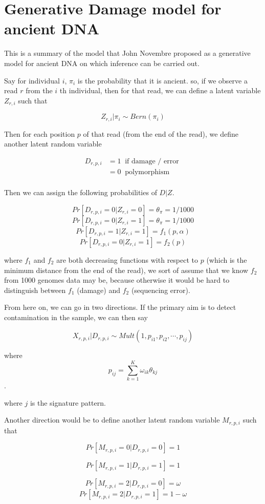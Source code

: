 \documentclass[12pt]{article}
\begin{document}
\section{Generative Damage model for ancient DNA}

This is a summary of the model that John Novembre proposed as a generative model for ancient DNA on which inference can be carried out. 

Say for individual $i$, $\pi_i$ is the probability that it is ancient. so, if we observe a read $r$ from the $i$ th individual, then for that read, we can define a latent variable $Z_{r,i}$ such that

$$  Z_{r,i} | \pi_{i} \sim Bern (\pi_{i}) $$

Then for each position $p$ of that read (from the end of the read), we define another latent random variable 

\begin{align}
D_{r,p,i}  & = 1  \;\; \text{if damage / error } \\
	      & = 0 \;\; \text{polymorphism} \\
\end{align}

Then we can assign the following probabilities of $D | Z$.

$$ Pr \left [ D_{r, p, i} = 0  |   Z_{r,i} = 0  \right ]  =  \theta_{\pi} = 1/1000 $$
$$ Pr \left [ D_{r, p, i} = 0  |   Z_{r,i} = 1  \right ]  =  \theta_{\pi} = 1/1000 $$
$$ Pr \left [ D_{r, p, i} = 1  |   Z_{r,i} = 1  \right ]  =  f_{1} (p, \alpha) $$
$$ Pr \left [ D_{r, p, i} = 0  |   Z_{r,i} = 1  \right ]  =  f_2 (p) $$

where $f_1$ and $f_2$ are both decreasing functions with respect to $p$ (which is the minimum distance from the end of the read), we sort of assume that we know $f_2$ from 1000 genomes data may be, because otherwise it would be hard to distinguish between $f_1$ (damage) and $f_2$ (sequencing error).

From here on, we can go in two directions. If the primary aim is to detect contamination in the sample, we can then say 

$$  X_{r, p, i} | D_{r, p, i}  \sim Mult \left (1, p_{i1}, p_{i2}, \cdots, p_{ij}  \right) $$

where $$ p_{ij} = \sum_{k=1}^{K} \omega_{ik} \theta_{kj}  $$.

where $j$ is the signature pattern.

Another direction would be to define another latent random variable $M_{r,p,i}$ such that 

$$  Pr \left [ M_{r, p, i} = 0  | D_{r, p, i} = 0 \right] = 1 $$

$$ Pr \left [ M_{r, p, i} =  1 | D_{r, p, i} = 1 \right] =1 $$

$$ Pr \left[M_{r, p, i}  = 2 | D_{r, p, i} = 0 \right] = \omega $$
$$ Pr \left[M_{r, p, i}  = 2 | D_{r, p, i} = 1 \right] = 1 - \omega $$
\end{document}
